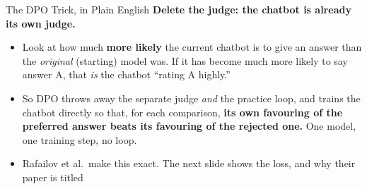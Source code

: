 \begin{frame}{The DPO Trick, in Plain English}
\textbf{Delete the judge: the chatbot is already its own judge.}
\begin{itemize}\itemsep0.55em
    \item Look at how much \textbf{more likely} the current chatbot is to give an
          answer than the \emph{original} (starting) model was. If it has become much
          more likely to say answer A, that \emph{is} the chatbot ``rating A
          highly.'' 
    \item So DPO throws away the separate judge \emph{and} the practice loop, and
          trains the chatbot directly so that, for each comparison, \textbf{its own
          favouring of the preferred answer beats its favouring of the rejected
          one.} One model, one training step, no loop.
    \item Rafailov et al.\ make this exact. The next slide shows the loss, and why
          their paper is titled 
\end{itemize}
\end{frame}

